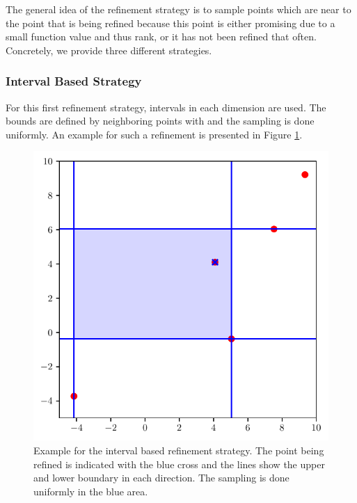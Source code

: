 The general idea of the refinement strategy is to sample points which are near to the point that is being refined because this point is either promising due to a small function value and thus rank, or it has not been refined that often. Concretely, we provide three different strategies.

\subsubsection{Interval Based Strategy}

For this first refinement strategy, intervals in each dimension are used. The bounds are defined by neighboring points with and the sampling is done uniformly. An example for such a refinement is presented in Figure \ref{fig:alternative_1}. \newline 

\begin{figure}[htbp!]
	\centering
	\includegraphics[scale=0.8]{figures/Adaptive_random/Visualizations/Alternative_1}
	\caption{ Example for the interval based refinement strategy. The point being refined is indicated with the blue cross and the lines show the upper and lower boundary in each direction. The sampling is done uniformly in the blue area. }
	\label{fig:alternative_1}
\end{figure}

